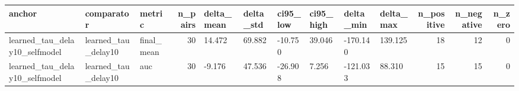 \begin{tabular}{lllrllllllrrr}
\toprule
anchor & comparator & metric & n_pairs & delta_mean & delta_std & ci95_low & ci95_high & delta_min & delta_max & n_positive & n_negative & n_zero \\
\midrule
learned_tau_delay10_selfmodel & learned_tau_delay10 & final_mean & 30 & 14.472 & 69.882 & -10.750 & 39.046 & -170.140 & 139.125 & 18 & 12 & 0 \\
learned_tau_delay10_selfmodel & learned_tau_delay10 & auc & 30 & -9.176 & 47.536 & -26.908 & 7.256 & -121.033 & 88.310 & 15 & 15 & 0 \\
\bottomrule
\end{tabular}
